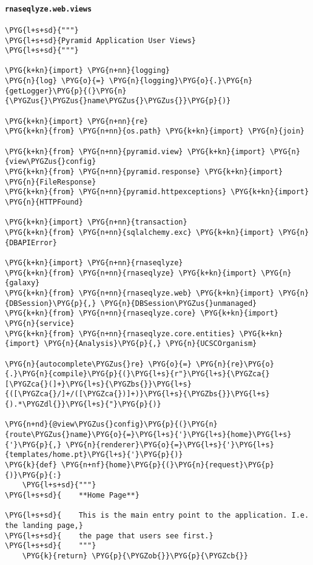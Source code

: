 \paragraph{\texttt{rnaseqlyze.web.views}}
\label{index-pdf4:rnaseqlyze-web-views}
\begin{Verbatim}[commandchars=\\\{\}]
\PYG{l+s+sd}{"""}
\PYG{l+s+sd}{Pyramid Application User Views}
\PYG{l+s+sd}{"""}

\PYG{k+kn}{import} \PYG{n+nn}{logging}
\PYG{n}{log} \PYG{o}{=} \PYG{n}{logging}\PYG{o}{.}\PYG{n}{getLogger}\PYG{p}{(}\PYG{n}{\PYGZus{}\PYGZus{}name\PYGZus{}\PYGZus{}}\PYG{p}{)}

\PYG{k+kn}{import} \PYG{n+nn}{re}
\PYG{k+kn}{from} \PYG{n+nn}{os.path} \PYG{k+kn}{import} \PYG{n}{join}

\PYG{k+kn}{from} \PYG{n+nn}{pyramid.view} \PYG{k+kn}{import} \PYG{n}{view\PYGZus{}config}
\PYG{k+kn}{from} \PYG{n+nn}{pyramid.response} \PYG{k+kn}{import} \PYG{n}{FileResponse}
\PYG{k+kn}{from} \PYG{n+nn}{pyramid.httpexceptions} \PYG{k+kn}{import} \PYG{n}{HTTPFound}

\PYG{k+kn}{import} \PYG{n+nn}{transaction}
\PYG{k+kn}{from} \PYG{n+nn}{sqlalchemy.exc} \PYG{k+kn}{import} \PYG{n}{DBAPIError}

\PYG{k+kn}{import} \PYG{n+nn}{rnaseqlyze}
\PYG{k+kn}{from} \PYG{n+nn}{rnaseqlyze} \PYG{k+kn}{import} \PYG{n}{galaxy}
\PYG{k+kn}{from} \PYG{n+nn}{rnaseqlyze.web} \PYG{k+kn}{import} \PYG{n}{DBSession}\PYG{p}{,} \PYG{n}{DBSession\PYGZus{}unmanaged}
\PYG{k+kn}{from} \PYG{n+nn}{rnaseqlyze.core} \PYG{k+kn}{import} \PYG{n}{service}
\PYG{k+kn}{from} \PYG{n+nn}{rnaseqlyze.core.entities} \PYG{k+kn}{import} \PYG{n}{Analysis}\PYG{p}{,} \PYG{n}{UCSCOrganism}

\PYG{n}{autocomplete\PYGZus{}re} \PYG{o}{=} \PYG{n}{re}\PYG{o}{.}\PYG{n}{compile}\PYG{p}{(}\PYG{l+s}{r"}\PYG{l+s}{\PYGZca{}[\PYGZca{}(]+}\PYG{l+s}{\PYGZbs{}}\PYG{l+s}{([\PYGZca{}/]+/([\PYGZca{})]+)}\PYG{l+s}{\PYGZbs{}}\PYG{l+s}{).*\PYGZdl{}}\PYG{l+s}{"}\PYG{p}{)}

\PYG{n+nd}{@view\PYGZus{}config}\PYG{p}{(}\PYG{n}{route\PYGZus{}name}\PYG{o}{=}\PYG{l+s}{'}\PYG{l+s}{home}\PYG{l+s}{'}\PYG{p}{,} \PYG{n}{renderer}\PYG{o}{=}\PYG{l+s}{'}\PYG{l+s}{templates/home.pt}\PYG{l+s}{'}\PYG{p}{)}
\PYG{k}{def} \PYG{n+nf}{home}\PYG{p}{(}\PYG{n}{request}\PYG{p}{)}\PYG{p}{:}
    \PYG{l+s+sd}{"""}
\PYG{l+s+sd}{    **Home Page**}

\PYG{l+s+sd}{    This is the main entry point to the application. I.e. the landing page,}
\PYG{l+s+sd}{    the page that users see first.}
\PYG{l+s+sd}{    """}
    \PYG{k}{return} \PYG{p}{\PYGZob{}}\PYG{p}{\PYGZcb{}}


\end{Verbatim}
